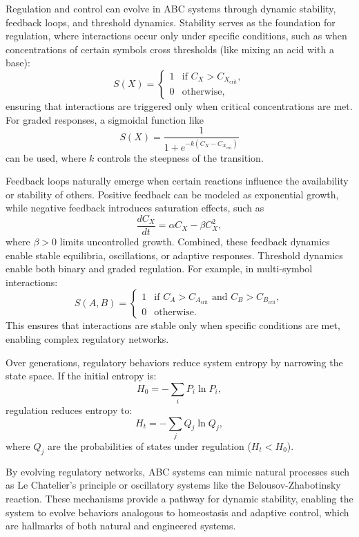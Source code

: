 \documentclass[entropy,article,submit,pdftex,moreauthors]{Definitions/mdpi}
\begin{document}
Regulation and control can evolve in ABC systems through dynamic stability, feedback loops, and threshold dynamics. Stability serves as the foundation for regulation, where interactions occur only under specific conditions, such as when concentrations of certain symbols cross thresholds (like mixing an acid with a base): \[
S(X) = 
\begin{cases} 
1 & \text{if } C_X > C_{X_{\text{crit}}}, \\
0 & \text{otherwise,}
\end{cases}
\]
ensuring that interactions are triggered only when critical concentrations are met. For graded responses, a sigmoidal function like
\[
S(X) = \frac{1}{1 + e^{-k(C_X - C_{X_{\text{crit}}})}}
\]
can be used, where \(k\) controls the steepness of the transition.

Feedback loops naturally emerge when certain reactions influence the availability or stability of others. Positive feedback can be modeled as exponential growth, while negative feedback introduces saturation effects, such as 
\[
\frac{dC_X}{dt} = \alpha C_X - \beta C_X^2,
\]
where \(\beta > 0\) limits uncontrolled growth. Combined, these feedback dynamics enable stable equilibria, oscillations, or adaptive responses. Threshold dynamics enable both binary and graded regulation. For example, in multi-symbol interactions:
\[
S(A, B) = 
\begin{cases} 
1 & \text{if } C_A > C_{A_{\text{crit}}} \text{ and } C_B > C_{B_{\text{crit}}}, \\
0 & \text{otherwise.}
\end{cases}
\]
This ensures that interactions are stable only when specific conditions are met, enabling complex regulatory networks.

Over generations, regulatory behaviors reduce system entropy by narrowing the state space. If the initial entropy is:
\[
H_0 = -\sum_{i} P_i \ln P_i,
\]
regulation reduces entropy to:
\[
H_t = -\sum_{j} Q_j \ln Q_j,
\]
where \(Q_j\) are the probabilities of states under regulation (\(H_t < H_0\)).

By evolving regulatory networks, ABC systems can mimic natural processes such as Le Chatelier's principle or oscillatory systems like the Belousov-Zhabotinsky reaction. These mechanisms provide a pathway for dynamic stability, enabling the system to evolve behaviors analogous to homeostasis and adaptive control, which are hallmarks of both natural and engineered systems.
\end{document}
